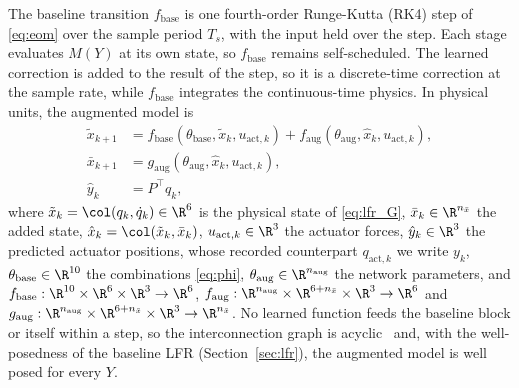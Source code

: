 The baseline transition $f_{\mathrm{base}}$ is one fourth-order Runge-Kutta
(RK4) step of \eqref{eq:eom} over the sample period $T_s$, with the input held
over the step.
Each stage evaluates $M(Y)$ at its own state, so $f_{\mathrm{base}}$ remains
self-scheduled.
The learned correction is added to the result of the step, so it is a
discrete-time correction at the sample rate, while $f_{\mathrm{base}}$
integrates the continuous-time physics.
In physical units, the augmented model is
\begin{equation}
\begin{aligned}
 \tilde x_{k+1}
 &=f_{\mathrm{base}}(\theta_{\mathrm{base}},\tilde x_k,u_{\mathrm{act},k})
   +f_{\mathrm{aug}}(\theta_{\mathrm{aug}},\hat x_k,u_{\mathrm{act},k}),\\
 \bar x_{k+1}
 &=g_{\mathrm{aug}}(\theta_{\mathrm{aug}},\hat x_k,u_{\mathrm{act},k}),\\
 \hat y_k&=P^\top q_k,
\end{aligned}
\label{eq:aug_transition}
\end{equation}
where $\tilde x_k=\col(q_k,\dot q_k)\in\R^6$ is the physical state of
\eqref{eq:lfr_G}, $\bar x_k\in\R^{n_{\bar x}}$ the added state,
$\hat x_k=\col(\tilde x_k,\bar x_k)$, $u_{\mathrm{act},k}\in\R^3$ the actuator
forces, $\hat y_k\in\R^3$ the predicted actuator positions, whose recorded
counterpart $q_{\mathrm{act},k}$ we write $y_k$,
$\theta_{\mathrm{base}}\in\R^{10}$ the combinations \eqref{eq:phi},
$\theta_{\mathrm{aug}}\in\R^{n_{\mathrm{aug}}}$ the network parameters, and
$f_{\mathrm{base}}:\R^{10}\times\R^6\times\R^3\to\R^6$,
$f_{\mathrm{aug}}:\R^{n_{\mathrm{aug}}}\times\R^{6+n_{\bar x}}\times\R^3\to\R^6$
and $g_{\mathrm{aug}}:\R^{n_{\mathrm{aug}}}\times\R^{6+n_{\bar x}}\times\R^3\to\R^{n_{\bar x}}$.
No learned function feeds the baseline block or itself within a step, so the
interconnection graph is acyclic~\cite[Thm.~1]{hoekstra2025lfr} and, with
the well-posedness of the baseline LFR (Section~\ref{sec:lfr}), the augmented
model is well posed for every $Y$.

